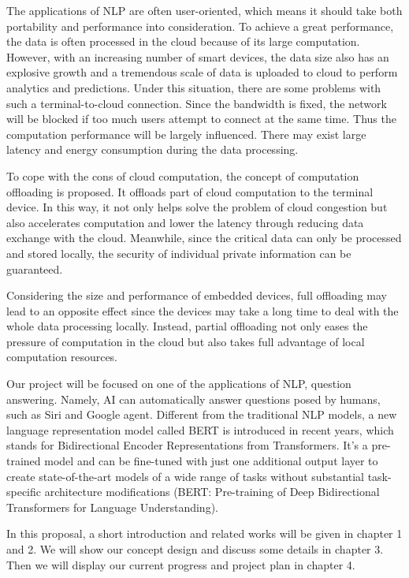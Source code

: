\documentclass[a4paper]{article}
\begin{document}
The applications of NLP are often user-oriented, which means it should take both portability and performance into consideration. To achieve a great performance, the data is often processed in the cloud because of its large computation. However, with an increasing number of smart devices, the data size also has an explosive growth and a tremendous scale of data is uploaded to cloud to perform analytics and predictions. Under this situation, there are some problems with such a terminal-to-cloud connection. Since the bandwidth is fixed, the network will be blocked if too much users attempt to connect at the same time. Thus the computation performance will be largely influenced. There may exist large latency and energy consumption during the data processing.

To cope with the cons of cloud computation, the concept of computation offloading is proposed. It offloads part of cloud computation to the terminal device. In this way, it not only helps solve the problem of cloud congestion but also accelerates computation and lower the latency through reducing data exchange with the cloud. Meanwhile, since the critical data can only be processed and stored locally, the security of individual private information can be guaranteed. 

Considering the size and performance of embedded devices, full offloading may lead to an opposite effect since the devices may take a long time to deal with the whole data processing locally.
Instead, partial offloading not only eases the pressure of computation in the cloud but also takes full advantage of local computation resources.

Our project will be focused on one of the applications of NLP, question answering. Namely, AI can automatically answer questions posed by humans, such as Siri and Google agent. Different from the traditional NLP models, a new language representation model called BERT is introduced in recent years, which stands for Bidirectional Encoder Representations from Transformers. It's a pre-trained model and can be fine-tuned with just one additional output layer to create state-of-the-art models of a wide range of tasks without substantial task-specific architecture modifications (BERT: Pre-training of Deep Bidirectional Transformers for Language Understanding). 

In this proposal, a short introduction and related works will be given in chapter 1 and 2. We will show our concept design and discuss some details in chapter 3. Then we will display our current progress and project plan in chapter 4.
\end{document}
